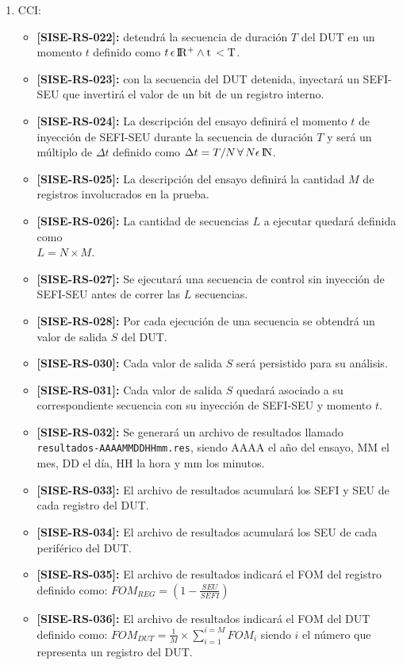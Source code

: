 \documentclass[
11pt, %
codirector, %
]{charter}
\def\codigo{SISE-RS}
\newcommand{\req}[1]{\textbf{[\codigo-#1]:}}
\begin{document}
\begin{enumerate}
	\item CCI:
		\begin{itemize}
			\item \req{022} detendrá la secuencia de duración $ T $ del DUT en un momento $ t $ definido como $ t \, \epsilon \, \rm I\!R^+ \wedge t \, < T$.
			\item \req{023} con la secuencia del DUT detenida, inyectará un SEFI-SEU que invertirá el valor de un bit de un registro interno.
			\item \req{024} La descripción del ensayo definirá el momento $ t $ de inyección de SEFI-SEU durante la secuencia de duración $ T $ y será un múltiplo de $\Delta t$ definido como $ \Delta t=T/N \, \forall \, N \epsilon \, \rm I\!N $.
			\item \req{025} La descripción del ensayo definirá la cantidad $ M $ de registros involucrados en la prueba.
			\item \req{026} La cantidad de secuencias $ L $ a ejecutar quedará definida como \\$ L = N \times M $.
			\item \req{027} Se ejecutará una secuencia de control sin inyección de SEFI-SEU antes de correr las $ L $ secuencias.
			\item \req{028} Por cada ejecución de una secuencia se obtendrá un valor de salida $ S $ del DUT.
			\item \req{030} Cada valor de salida $ S $ será persistido para su análisis.
			\item \req{031} Cada valor de salida $ S $ quedará asociado a su correspondiente secuencia con su inyección de SEFI-SEU y momento $ t $.
			\item \req{032} Se generará un archivo de resultados llamado\\ \texttt{resultados-AAAAMMDDHHmm.res}, siendo AAAA el año del ensayo, MM el mes, DD el día, HH la hora y mm los minutos.
			\item \req{033} El archivo de resultados acumulará los SEFI y SEU de cada registro del DUT.
			\item \req{034} El archivo de resultados acumulará los SEU de cada periférico del DUT.
			\item \req{035} El archivo de resultados indicará el FOM del registro definido como:
			$ FOM_{REG} = (1 - \frac{SEU}{SEFI}) $
			\item \req{036} El archivo de resultados indicará el FOM del DUT definido como:
			$ FOM_{DUT} = \frac{1}{M} \times \sum_{i = 1}^{i = M}FOM_{i} $ siendo $ i $ el número que representa un registro del DUT.

\end{itemize}
\end{enumerate}
\end{document}
